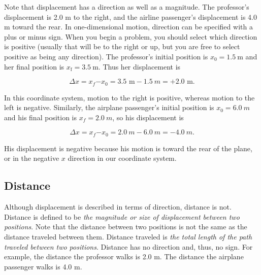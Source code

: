 \documentclass[
]{book}
\begin{document}
Note that displacement has a direction as well as a magnitude. The
professor's displacement is 2.0 m to the right, and the airline
passenger's displacement is 4.0 m toward the rear. In one-dimensional
motion, direction can be specified with a plus or minus sign. When you
begin a problem, you should select which direction is positive (usually
that will be to the right or up, but you are free to select positive as
being any direction). The professor's initial position is
\({{x_{0} = 1}\text{.}5\ \text{m}}{}\) and her final position is
\({{x_{\text{f}} = 3}\text{.}5\ \text{m}}{}\). Thus her displacement is

\leavevmode\hypertarget{eip-556}{}%
\[{{{\Delta x = x_{f}{- x_{0}} = 3}\text{.5\ m} - 1.5\ m = + 2\text{.0\ m}}.}{}\]

In this coordinate system, motion to the right is positive, whereas
motion to the left is negative. Similarly, the airplane passenger's
initial position is \({x_{0} = 6}\text{.}0\ m\) and his final position is
\({{x_{f} = 2}\text{.}0\ m}{}\), so his displacement is

\leavevmode\hypertarget{eip-778}{}%
\[{{\Delta x = x_{f}{- x_{0}} = 2}\text{.}0\ m - 6\text{.}0\ m = {- 4}\text{.}0\ m}.\]

His displacement is negative because his motion is toward the rear of
the plane, or in the negative \(x{}\) direction in our coordinate system.

\hypertarget{fs-id1414454}{}
\hypertarget{distance}{%
\subsection{Distance}\label{distance}}

Although displacement is described in terms of direction, distance is
not. {Distance} is defined to be \emph{the magnitude or
size of displacement between two positions}. Note that the distance
between two positions is not the same as the distance traveled between
them. {Distance traveled} is \emph{the total length of the
path traveled between two positions}. Distance has no direction and,
thus, no sign. For example, the distance the professor walks is 2.0 m.
The distance the airplane passenger walks is 4.0 m.
\end{document}
